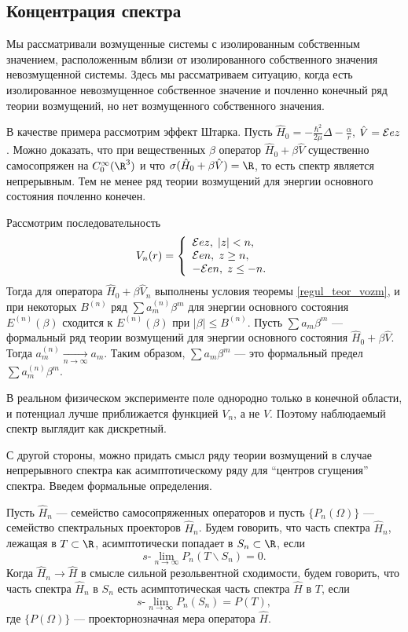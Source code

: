 \documentclass[a4paper
]{article}
\begin{document}
\subsection{Концентрация спектра}
Мы рассматривали возмущенные системы с изолированным собственным значением,
расположенным вблизи от изолированного собственного значения невозмущенной
системы. Здесь мы рассматриваем ситуацию, когда есть изолированное
невозмущенное собственное значение и почленно конечный ряд теории возмущений,
но нет возмущенного собственного значения. \par
В качестве примера рассмотрим эффект Штарка. Пусть $\hat H_0=-\frac{\hbar
^2}{2\mu}\Delta-\frac{\alpha}{r}$, $\hat V={\cal E}ez$. Можно доказать,
что при вещественных $\beta$ оператор $\hat H_0+\beta \hat V$ существенно
самосопряжен на $C_0^\infty(\R^3)$ и что $\sigma(\hat H_0+\beta \hat V)
=\R$, то есть спектр является непрерывным. Тем не менее ряд теории
возмущений для энергии основного состояния почленно конечен. \par
Рассмотрим последовательность $$V_n(r)=\left\{\begin{array}{l}
{\cal E}ez, \; |z|<n, \\ {\cal E}en, \; z\ge n, \\ -{\cal E}en, \; z\le
-n.\end{array}\right.$$ Тогда
для оператора $\hat H_0+\beta \hat V_n$ выполнены условия теоремы
\ref{regul_teor_vozm}, и при некоторых $B^{(n)}$ ряд $\sum a_m^{(n)}
\beta^m$ для энергии основного состояния $E^{(n)}(\beta)$ сходится к
$E^{(n)}(\beta)$ при $|\beta|\le B^{(n)}$. Пусть $\sum a_m\beta^m$ ---
формальный ряд теории возмущений для энергии основного состояния $\hat
H_0+\beta \hat V$. Тогда $a_m^{(n)}\underset{n\rightarrow \infty}{\rightarrow}
a_m$. Таким образом, $\sum a_m\beta^m$ --- это формальный предел $\sum a_m^{(n)}
\beta^m$. \par
В реальном физическом эксперименте поле однородно только в
конечной области, и потенциал лучше приближается функцией $V_n$, а не
$V$. Поэтому наблюдаемый спектр выглядит как дискретный. \par
С другой стороны, можно придать смысл ряду теории возмущений в случае
непрерывного спектра как асимптотическому ряду для ``центров сгущения''
спектра. Введем формальные определения. \par
\begin{Def}
\label{def_asimpt}
Пусть $\hat H_n$ --- семейство самосопряженных операторов и пусть $\{P_n
(\Omega)\}$ --- семейство спектральных проекторов $\hat H_n$. Будем
говорить, что часть спектра $\hat H_n$, лежащая в $T\subset \R$,
асимптотически попадает в $S_n\subset \R$, если $$s\text{-}\lim \limits
_{n\rightarrow \infty}P_n(T\backslash S_n)=0.$$
Когда $\hat H_n\rightarrow \hat H$ в смысле сильной резольвентной
сходимости, будем говорить, что часть спектра $\hat H_n$ в $S_n$ есть
асимптотическая часть спектра $\hat H$ в $T$, если
$$s\text{-}\lim \limits_{n\rightarrow \infty}P_n(S_n)=P(T),$$ где
$\{P(\Omega)\}$ --- проекторнозначная мера оператора $\hat H$.
\end{Def}
\end{document}
